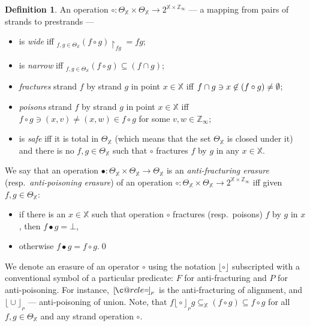 \documentclass [a4paper,12pt] {article}
\makeatletter
\theoremstyle{definition}
\newtheorem{definition}{Definition}[section]
\newcommand{\Forall}{}
\DeclareRobustCommand{\Forall}{\displaystyle\mathop{\textstyle\mathlarger{\forall}}}
\newcommand{\exconflict}{}
\DeclareRobustCommand{\exconflict}{\mathbin{\natural}}
\newcommand{\symdiff}{}
\DeclareRobustCommand{\symdiff}{\mathbin{\triangle}}
\newcommand{\domain}{}
\DeclareRobustCommand{\domain}{\mathop{\textstyle\mathsmaller{\bf {Dom}}}}
\newcommand{\uni}{}
\DeclareRobustCommand{\uni}{{\textstyle\mathlarger{\mathfrak{u}}}}
\newcommand\c@rcle[2]{\mathbin{\ooalign{\hidewidth$#1#2$\hidewidth\crcr$#1\ocircle$}}}
\newcommand{\oeq}{\mathbin{\mathpalette\c@rcle{\raisebox{0.08em}{$\mathsmaller{=}$}}}}
\makeatother
\begin{document}
\begin {definition}\label{def-strand-operations}
  An operation $\circ\!: \Theta_{\mathbb X}\times\Theta_{\mathbb
    X}\rightarrow2^{{\mathbb X} \times {\mathbb Z}_\infty}$ --- a
  mapping from pairs of strands to prestrands ---
  \begin {itemize}
  \item is {\em wide}\/ iff $\Forall_{f, g \in \Theta_{\mathbb X}} (f
    \circ g){\restriction}_{\domain{f}\symdiff\domain{g}} = f
    \exconflict g$;
  \item is {\em narrow}\/ iff $\Forall_{f, g \in \Theta_{\mathbb X}}
    \domain{(f \circ g)} \subseteq (\domain{f} \cap \domain{g})$;
  \item {\em fractures}\/ strand $f$ by strand $g$ in point $x \in
    {\mathbb X}$ iff $\domain{f} \cap \domain{g} \ni x \not\in
    \domain{(f \circ g)}\linebreak \neq \emptyset$;
    \item {\em poisons}\/ strand $f$ by strand $g$ in point $x \in
      {\mathbb X}$ iff $f \circ g \ni (x, v) \neq (x, w) \in f \circ
      g$ for some $v, w \in {\mathbb Z}_\infty$;
    \item is {\em safe}\/ iff it is total in $\Theta_{\mathbb X}$
      (which means that the set $\Theta_{\mathbb X}$ is closed under
      it) and there is no $f, g \in \Theta_{\mathbb X}$ such that
      $\circ$ fractures $f$ by $g$ in any $x \in {\mathbb X}$.
  \end {itemize}
    
  We say that an operation $\bullet\!: \Theta_{\mathbb
    X}\times\Theta_{\mathbb X}\rightarrow\Theta_{\mathbb X}$ is an
  {\em anti-fracturing erasure}\/ (resp.\ {\em anti-poisoning
    erasure}\/) of an operation $\circ\!: \Theta_{\mathbb
    X}\times\Theta_{\mathbb X}\rightarrow2^{{\mathbb X} \times
    {\mathbb Z}_\infty}$ iff given $f, g \in \Theta_{\mathbb X}$:
    \begin {itemize}
      \item if there is an $x \in {\mathbb X}$ such that operation
        $\circ$ fractures (resp.\ poisons) $f$ by $g$ in $x$, then
        $f \bullet g = \bot$,
      \item otherwise $f \bullet g = f \circ g$.\qed
    \end {itemize}
\end {definition}

We denote an erasure of an operator $\circ$ using the notation
$\lfloor\circ\rfloor$ subscripted with a conventional symbol of a
particular predicate: $F$ for anti-fracturing and $P$ for
anti-poisoning.  For instance, $\lfloor\!\oeq\!\rfloor_{\!{}_F}$ is
the anti-fracturing of alignment, and
$\lfloor\!\cup\!\rfloor_{\!{}_P}$ --- anti-poisoning of union.  Note,
that $f\lfloor\!\circ\!\rfloor_{\!{}_{P}}g \subseteq \uni_{\mathbb
  X}(f\circ g) \subseteq f\circ g$ for all $f, g \in \Theta_{\mathbb
  X}$ and any strand operation $\circ$.
\end{document}
